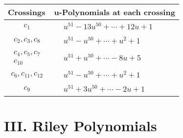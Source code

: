 \documentclass[1p]{elsarticle_modified}
\theoremstyle{definition}
\begin{document}
\begin{tabular}{m{50pt}|m{274pt}}
Crossings & \hspace{64pt}u-Polynomials at each crossing \\
\hline $$\begin{aligned}c_{1}\end{aligned}$$&$\begin{aligned}
&u^{51}-13 u^{50}+\cdots+12 u+1
\end{aligned}$\\
\hline $$\begin{aligned}c_{2},c_{3},c_{8}\end{aligned}$$&$\begin{aligned}
&u^{51}- u^{50}+\cdots+u^2+1
\end{aligned}$\\
\hline $$\begin{aligned}c_{4},c_{5},c_{7}\\c_{10}\end{aligned}$$&$\begin{aligned}
&u^{51}+u^{50}+\cdots-8 u+5
\end{aligned}$\\
\hline $$\begin{aligned}c_{6},c_{11},c_{12}\end{aligned}$$&$\begin{aligned}
&u^{51}- u^{50}+\cdots+u^2+1
\end{aligned}$\\
\hline $$\begin{aligned}c_{9}\end{aligned}$$&$\begin{aligned}
&u^{51}+3 u^{50}+\cdots-2 u+1
\end{aligned}$\\
\hline
\end{tabular}\newpage\renewcommand{\arraystretch}{1}
\centering \section*{ III. Riley Polynomials}
\end{document}
